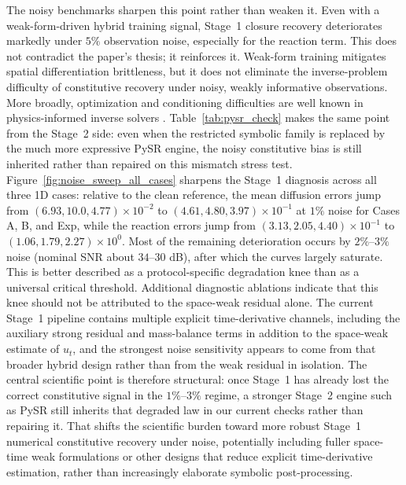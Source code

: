\documentclass[preprint,12pt]{elsarticle}
\begin{document}
The noisy benchmarks sharpen this point rather than weaken it. Even with a weak-form-driven hybrid training signal, Stage~1 closure recovery deteriorates markedly under $5\%$ observation noise, especially for the reaction term. This does not contradict the paper's thesis; it reinforces it. Weak-form training mitigates spatial differentiation brittleness, but it does not eliminate the inverse-problem difficulty of constitutive recovery under noisy, weakly informative observations. More broadly, optimization and conditioning difficulties are well known in physics-informed inverse solvers \cite{Wang_2022}. Table~\ref{tab:pysr_check} makes the same point from the Stage~2 side: even when the restricted symbolic family is replaced by the much more expressive PySR engine, the noisy constitutive bias is still inherited rather than repaired on this mismatch stress test. Figure~\ref{fig:noise_sweep_all_cases} sharpens the Stage~1 diagnosis across all three 1D cases: relative to the clean reference, the mean diffusion errors jump from $(6.93, 10.0, 4.77)\times 10^{-2}$ to $(4.61, 4.80, 3.97)\times 10^{-1}$ at $1\%$ noise for Cases A, B, and Exp, while the reaction errors jump from $(3.13, 2.05, 4.40)\times 10^{-1}$ to $(1.06, 1.79, 2.27)\times 10^{0}$. Most of the remaining deterioration occurs by $2\%$--$3\%$ noise (nominal SNR about $34$--$30$ dB), after which the curves largely saturate. This is better described as a protocol-specific degradation knee than as a universal critical threshold. Additional diagnostic ablations indicate that this knee should not be attributed to the space-weak residual alone. The current Stage~1 pipeline contains multiple explicit time-derivative channels, including the auxiliary strong residual and mass-balance terms in addition to the space-weak estimate of $u_t$, and the strongest noise sensitivity appears to come from that broader hybrid design rather than from the weak residual in isolation. The central scientific point is therefore structural: once Stage~1 has already lost the correct constitutive signal in the $1\%$--$3\%$ regime, a stronger Stage~2 engine such as PySR still inherits that degraded law in our current checks rather than repairing it. That shifts the scientific burden toward more robust Stage~1 numerical constitutive recovery under noise, potentially including fuller space-time weak formulations or other designs that reduce explicit time-derivative estimation, rather than increasingly elaborate symbolic post-processing.
\end{document}
